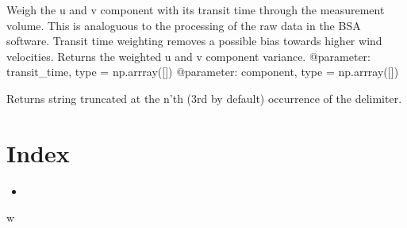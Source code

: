 \documentclass[letterpaper,10pt,english]{sphinxmanual}
\begin{document}

\begin{fulllineitems}
\label{\detokenize{index:windtunnel.transit_time_weighted_var}}
Weigh the u and v component with its transit time through the
measurement volume. This is analoguous to the processing of the raw
data in the BSA software. Transit time weighting removes a possible
bias towards higher wind velocities. Returns the weighted u and v
component variance.
@parameter: transit\_time, type = np.arrray({[}{]})
@parameter: component,  type = np.arrray({[}{]})

\end{fulllineitems}


\begin{fulllineitems}
\label{\detokenize{index:windtunnel.trunc_at}}
Returns string truncated at the n’th (3rd by default) occurrence of the
delimiter.

\end{fulllineitems}



\chapter{Index}
\label{\detokenize{index:index}}\begin{itemize}
\item {} 

\end{itemize}


\renewcommand{\indexname}{Python Module Index}
\begin{sphinxtheindex}
\def\bigletter#1{{\Large\sffamily#1}\nopagebreak\vspace{1mm}}
\bigletter{w}
\item {}
\end{sphinxtheindex}

\renewcommand{\indexname}{Index}
\printindex
\end{document}
